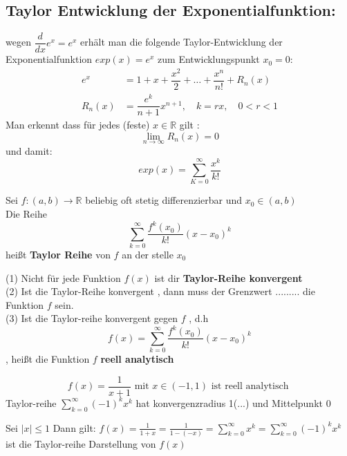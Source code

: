 \subsection{Taylor Entwicklung der Exponentialfunktion:}
wegen $\dfrac{d}{dx}e^x = e^x$ erhält man die folgende Taylor-Entwicklung der Exponentialfunktion $exp(x) = e^x$ zum Entwicklungspunkt $x_0 = 0$:
\begin{align*}
e^x &= 1 + x + \dfrac{x^2}{2} + \dots + \dfrac{x^n}{n!} + R_n(x)\\
R_n(x) &= \dfrac{e^k}{n+1}x^{n+1}, \quad k = rx , \quad 0 < r < 1
\end{align*}
Man erkennt dass für jedes (feste) $x \in \mathbb{R}$ gilt : 
\[ \lim_{n \to \infty}{R_n(x) = 0} \]
und damit: \[ exp(x) = \sum_{K=0}^{\infty}\dfrac{x^k}{k!} \] 
\begin{definition}
Sei $f : (a,b) \rightarrow \mathbb{R}$ beliebig oft stetig differenzierbar und $x_0 \in (a,b)$\\
Die Reihe \[ \sum_{k=0}^{\infty}{\frac{f^k(x_0)}{k!}(x-x_0)^k}\] heißt \textbf{Taylor Reihe} von $f$ an der stelle $x_0$ 
\end{definition}
\begin{remark}
(1) Nicht für jede Funktion $f(x)$ ist dir \textbf{Taylor-Reihe konvergent}\\
(2) Ist die Taylor-Reihe konvergent , dann muss der Grenzwert ......... die Funktion $f$ sein.\\
(3) Ist die Taylor-reihe konvergent gegen $f$ , d.h \[f(x)= \sum_{k=0}^{\infty}{\frac{f^k(x_0)}{k!}(x - x_0)^k}\] , heißt die Funktion $f$ \textbf{reell analytisch} \\
\end{remark}
\begin{example}
\[ f(x) = \frac{1}{x+1} \text{ mit } x \in (-1 , 1) \text{ ist reell analytisch }  \]
Taylor-reihe $\sum_{k=0}^{\infty}{(-1)^kx^k}$ hat konvergenzradius 1(...) und Mittelpunkt 0 
\end{example}
\begin{theorem}
Sei $|x| \leq 1 $ Dann gilt: $f(x) = \frac{1}{1 + x} =\frac{1}{1-(-x)} = \sum_{k=0}^{\infty}{x^k} = \sum_{k=0}^{\infty}{(-1)^kx^k}$ ist die Taylor-reihe Darstellung von $f(x)$ 
\end{theorem}
